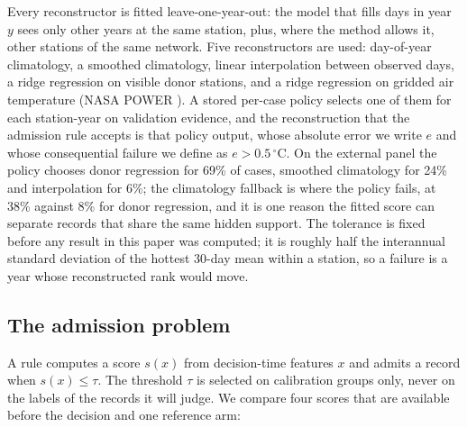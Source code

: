 \documentclass[draft]{agujournal2025}
\begin{document}
Every reconstructor is fitted leave-one-year-out: the model that fills days in
year $y$ sees only other years at the same station, plus, where the method
allows it, other stations of the same network. Five reconstructors are used:
day-of-year climatology, a smoothed climatology, linear interpolation between
observed days, a ridge regression on visible donor stations, and a ridge
regression on gridded air temperature (NASA POWER \cite{nasapower2026}). A stored per-case policy selects one of
them for each station-year on validation evidence, and the reconstruction that
the admission rule accepts is that policy output, whose absolute error we write
$e$ and whose consequential failure we define as $e>0.5\,^{\circ}$C. On the
external panel the policy chooses donor regression for 69\% of cases, smoothed
climatology for 24\% and interpolation for 6\%; the climatology fallback is
where the policy fails, at 38\% against 8\% for donor regression, and it is one
reason the fitted score can separate records that share the same hidden
support. The
tolerance is fixed before any result in this paper was computed; it is roughly
half the interannual standard deviation of the hottest 30-day mean within a
station, so a failure is a year whose reconstructed rank would move.

\subsection{The admission problem}

A rule computes a score $s(x)$ from decision-time features $x$ and admits a
record when $s(x)\le\tau$. The threshold $\tau$ is selected on calibration
groups only, never on the labels of the records it will judge. We compare four
scores that are available before the decision and one reference arm:
\end{document}
